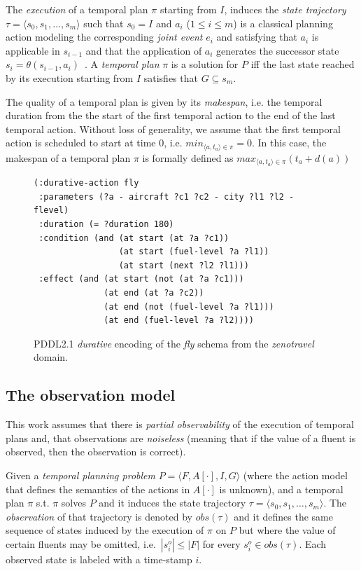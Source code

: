 \documentclass[letterpaper]{article} %
\newcommand{\tup}[1]{{\langle #1 \rangle}}
\begin{document}
The {\em execution} of a temporal plan $\pi$ starting from $I$, induces the {\em state trajectory} $\tau=\tup{s_0, s_1, \ldots, s_m}$ such that $s_0=I$ and $a_i$ ({\small $1\leq i\leq m$}) is a classical planning action modeling the corresponding {\em joint event} $e_i$ and satisfying that $a_i$ is applicable in $s_{i-1}$ and that the application of $a_i$ generates the successor state $s_i=\theta(s_{i-1},a_i)$~\cite{jimenez2015temporal}. A {\em temporal plan} $\pi$ is a solution for $P$ iff the last state reached by its execution starting from $I$ satisfies that $G\subseteq s_m$.

The quality of a temporal plan is given by its {\em makespan}, i.e. the temporal duration from the the start of the first temporal action to the end of the last temporal action. Without loss of generality, we assume that the first temporal action is scheduled to start at time 0, i.e. $min_{\tup{a,t_a}\in\pi}= 0$. In this case, the makespan of a temporal plan $\pi$ is formally defined as $max_{\tup{a,t_a}\in\pi}(t_a+d(a))$

\begin{figure}
	\begin{scriptsize}
		\begin{verbatim}
(:durative-action fly 
 :parameters (?a - aircraft ?c1 ?c2 - city ?l1 ?l2 - flevel)
 :duration (= ?duration 180)
 :condition (and (at start (at ?a ?c1))
                 (at start (fuel-level ?a ?l1))
                 (at start (next ?l2 ?l1)))
 :effect (and (at start (not (at ?a ?c1)))
              (at end (at ?a ?c2))
              (at end (not (fuel-level ?a ?l1)))
              (at end (fuel-level ?a ?l2)))) 
		\end{verbatim}
	\end{scriptsize}
	\caption{PDDL2.1 {\em durative} encoding of the {\em fly} schema from the {\em zenotravel} domain.}
	\label{fig:flyt}
\end{figure}


\subsection{The observation model}
This work assumes that there is {\em partial observability} of the execution of temporal plans and, that observations are {\em noiseless} (meaning that if the value of a fluent is observed, then the observation is correct).

Given a {\em temporal planning problem} $P=\tup{F,A[\cdot],I,G}$ (where the action model that defines the semantics of the actions in $A[\cdot]$ is unknown), and a temporal plan $\pi$ s.t. $\pi$ solves $P$ and it induces the state trajectory $\tau=\tup{s_0, s_1, \ldots, s_m}$. The {\em observation} of that trajectory is denoted by $obs(\tau)$ and it defines the same sequence of states induced by the execution of $\pi$ on $P$ but where the value of certain fluents may be omitted, i.e.~$|s^o_i|\leq |F|$ for every $s^o_i\in obs(\tau)$. Each observed state is labeled with a time-stamp $i$.
\end{document}
